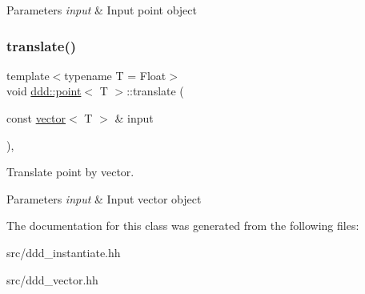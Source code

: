 \begin{DoxyParams}{Parameters}
{\em input} & Input point object \\
\hline
\end{DoxyParams}
\mbox{\label{classddd_1_1point_a36c06fef72376a058c663dd9632ddcd0}} 
\subsubsection{\texorpdfstring{translate()}{translate()}}
{\footnotesize\ttfamily template$<$typename T = Float$>$ \\
void \hyperlink{classddd_1_1point}{ddd\+::point}$<$ T $>$\+::translate (\begin{DoxyParamCaption}\item[{const \hyperlink{classddd_1_1vector}{vector}$<$ T $>$ \&}]{input }\end{DoxyParamCaption})\hspace{0.3cm}{\ttfamily [inline]}, {\ttfamily [inherited]}}



Translate point by vector. 


\begin{DoxyParams}{Parameters}
{\em input} & Input vector object \\
\hline
\end{DoxyParams}


The documentation for this class was generated from the following files\+:\begin{DoxyCompactItemize}
\item 
src/ddd\+\_\+instantiate.\+hh\item 
src/ddd\+\_\+vector.\+hh\end{DoxyCompactItemize}
